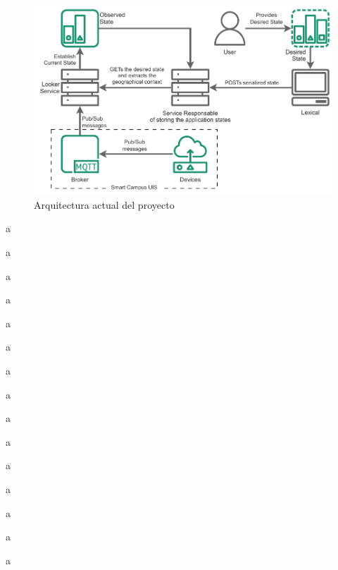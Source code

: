 \begin{figure}[h]
    \centering
    \caption{Arquitectura actual del proyecto}
    \label{fig:StarDuckBasic}
    \includegraphics[width=\linewidth]{images/StarDuckBasic.pdf}
\end{figure}


a

a

a

a

a

a

a

a

a

a

a

a

a

a

a
